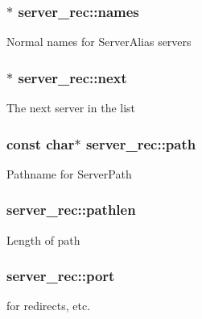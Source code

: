 \subsubsection[{\texorpdfstring{names}{names}}]{$\ast$ server\+\_\+rec\+::names}\hypertarget{structserver__rec_a650728c44a16d833908075a6481ea707}{}\label{structserver__rec_a650728c44a16d833908075a6481ea707}
Normal names for Server\+Alias servers 
\subsubsection[{\texorpdfstring{next}{next}}]{$\ast$ server\+\_\+rec\+::next}\hypertarget{structserver__rec_a8bbf4ea1c54cdba1cb7e00f9d978f540}{}\label{structserver__rec_a8bbf4ea1c54cdba1cb7e00f9d978f540}
The next server in the list 
\subsubsection[{\texorpdfstring{path}{path}}]{\setlength{\rightskip}{0pt plus 5cm}const char$\ast$ server\+\_\+rec\+::path}\hypertarget{structserver__rec_a225ec9e578ea235f3f8a8dcf5925eda7}{}\label{structserver__rec_a225ec9e578ea235f3f8a8dcf5925eda7}
Pathname for Server\+Path 
\subsubsection[{\texorpdfstring{pathlen}{pathlen}}]{ server\+\_\+rec\+::pathlen}\hypertarget{structserver__rec_a32311990957c8b65ad7f3e3790f01ba1}{}\label{structserver__rec_a32311990957c8b65ad7f3e3790f01ba1}
Length of path 
\subsubsection[{\texorpdfstring{port}{port}}]{ server\+\_\+rec\+::port}\hypertarget{structserver__rec_ae46ad679b7fd52db7100c96003738693}{}\label{structserver__rec_ae46ad679b7fd52db7100c96003738693}
for redirects, etc. 
